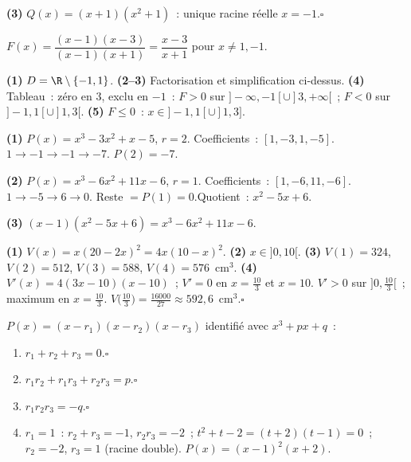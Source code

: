 \textbf{(3)} $Q(x)=(x+1)(x^2+1)$~: unique racine r\'eelle $x=-1$.\hfill$\square$


$F(x)=\dfrac{(x-1)(x-3)}{(x-1)(x+1)}=\dfrac{x-3}{x+1}$ pour $x\ne1,-1$.

\textbf{(1)} $D=\R\setminus\{-1,1\}$.
\textbf{(2--3)} Factorisation et simplification ci-dessus.
\textbf{(4)} Tableau~: z\'ero en $3$, exclu en $-1$~:
$F>0$ sur $]-\infty,-1[\cup]3,+\infty[$~; $F<0$ sur $]-1,1[\cup]1,3[$.
\textbf{(5)} $F\leq0$~: $x\in]-1,1[\cup]1,3]$.


\textbf{(1)} $P(x)=x^3-3x^2+x-5$, $r=2$. Coefficients~: $[1,-3,1,-5]$.
$1\to-1\to-1\to-7$. $P(2)=-7$.

\textbf{(2)} $P(x)=x^3-6x^2+11x-6$, $r=1$. Coefficients~: $[1,-6,11,-6]$.
$1\to-5\to6\to0$. Reste $=P(1)=0$.\checkmark\quad Quotient~: $x^2-5x+6$.

\textbf{(3)} $(x-1)(x^2-5x+6)=x^3-6x^2+11x-6$.\checkmark


\textbf{(1)} $V(x)=x(20-2x)^2=4x(10-x)^2$.
\textbf{(2)} $x\in]0,10[$.
\textbf{(3)} $V(1)=324$, $V(2)=512$, $V(3)=588$, $V(4)=576$~cm$^3$.
\textbf{(4)} $V'(x)=4(3x-10)(x-10)$~; $V'=0$ en $x=\tfrac{10}{3}$ et $x=10$.
$V'>0$ sur $]0,\tfrac{10}{3}[$~; maximum en $x=\tfrac{10}{3}$.
$V\!\bigl(\tfrac{10}{3}\bigr)=\tfrac{16000}{27}\approx592{,}6$~cm$^3$.\hfill$\square$


$P(x)=(x-r_1)(x-r_2)(x-r_3)$ identifi\'e avec $x^3+px+q$~:
\begin{enumerate}
  \item $r_1+r_2+r_3=0$.\hfill$\square$
  \item $r_1r_2+r_1r_3+r_2r_3=p$.\hfill$\square$
  \item $r_1r_2r_3=-q$.\hfill$\square$
  \item $r_1=1$~: $r_2+r_3=-1$, $r_2r_3=-2$~;
        $t^2+t-2=(t+2)(t-1)=0$~; $r_2=-2$, $r_3=1$ (racine double).
        $P(x)=(x-1)^2(x+2)$.\checkmark
\end{enumerate}

